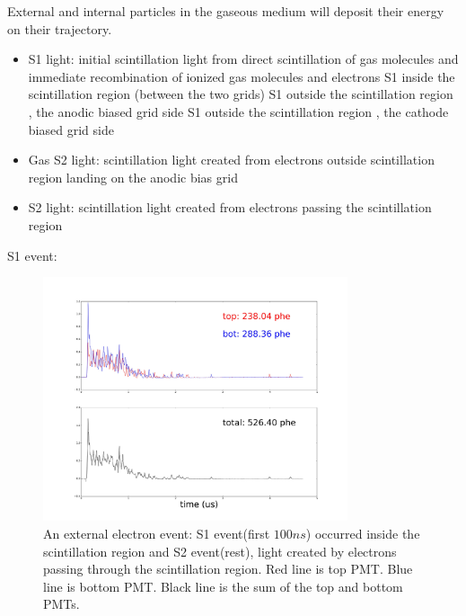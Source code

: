 External and internal particles in the gaseous medium will deposit their energy on their trajectory.
\begin{itemize}


\item S1 light: initial scintillation light from direct scintillation of gas molecules and immediate recombination of ionized gas molecules and electrons
	\subitem S1 inside the scintillation region (between the two grids)
	\subitem S1 outside the scintillation region , the anodic biased grid side
    \subitem S1 outside the scintillation region , the cathode biased grid side
\item Gas S2 light: scintillation light created from electrons outside scintillation region landing on the anodic bias grid
\item S2 light: scintillation light created from electrons passing the scintillation region
\end{itemize} 

S1 event: 

\begin{center}
\begin{figure}[!htbp]
  \centering
  \includegraphics[width=0.8\textwidth,clip,trim={0 0 0 0}]
  {Figures/Ch10/SampleWaveforms/_64767_a_+6_0_g_-6_0_Cut33_big_pulse_PlotCoinWaveforms_42_.jpg}
  \caption{An external electron event: S1 event(first $100 ns$) occurred inside the scintillation region and S2 event(rest), light created by electrons passing through the scintillation region. Red line is top PMT. Blue line is bottom PMT. Black line is the sum of the top and bottom PMTs. }
  \label{fig: external electron}
\end{figure}
\end{center}

